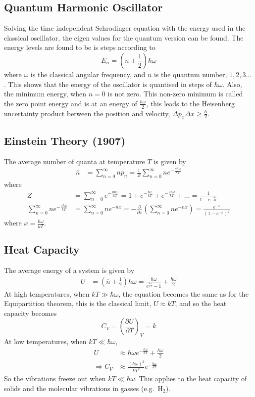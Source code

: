 \documentclass[british]{article}
\newcommand{\pd}[2]{\frac{\partial #1}{\partial #2}} %
\begin{document}
\subsection{Quantum Harmonic Oscillator}
Solving the time independent Schrodinger equation with the energy used in the classical oscillator, the eigen values for the quantum version can be found. The energy levels are found to be is steps according to
\[
	E_n = \left(n+\frac{1}{2}\right)\hbar\omega
\]
where $\omega$ is the classical angular frequency, and $n$ is the quantum number, $1,2,3\ldots$. This shows that the energy of the oscillator is quantised in steps of $\hbar\omega$. Also, the minimum energy, when $n=0$ is not zero. This non-zero minimum is called the zero point energy and is at an energy of $\frac{\hbar\omega}{2}$, this leads to the Heisenberg uncertainty product between the position and velocity, $\Delta p_x\Delta x \ge \frac{\hbar}{2}$.

\subsection{Einstein Theory (1907)}
The average number of quanta at temperature $T$ is given by
\begin{align*}
	\overline{n} &= \sum_{n=0}^\infty np_n = \frac{1}{Z}\sum_{n=0}^\infty ne^{-\frac{n\hbar\omega}{kT}}
\end{align*}
where
\begin{align*}
	Z &=\sum_{n=0}^\infty e^{-\frac{n\hbar\omega}{kT}} = 1 + e^{-\frac{\hbar\omega}{kT}} + e^{-\frac{2\hbar\omega}{kT}} + \ldots = \frac{1}{1-e^{-\frac{\hbar\omega}{kT}} }\\
	\sum_{n=0}^\infty ne^{-\frac{n\hbar\omega}{kT}} &= \sum_{n=0}^\infty ne^{-nx} = -\pd{}{x}\left(\sum_{n=0}^\infty ne^{-nx} \right) = \frac{e^{-x}}{\left(1-e^{-x}\right)^2}
\end{align*}
where $x=\frac{\hbar\omega}{kT}$.

\subsection{Heat Capacity}
The average energy of a system is given by
\begin{align*}
	U &= \left(\overline{n}+\frac{1}{2}\right)\hbar\omega = \frac{\hbar\omega}{e^{\frac{\hbar\omega}{kT}}-1}+\frac{\hbar\omega}{2}
\end{align*}
At high temperatures, when $kT\gg \hbar\omega$, the equation becomes the same as for the Equipartition theorem, this is the classical limit, $U\approx kT$, and so the heat capacity becomes
\[
C_V = \left(\pd{U}{T}\right)_V = k
\]
At low temperatures, when  $kT\ll \hbar\omega$,
\begin{align*}
	U &\approx \hbar\omega e^{-\frac{\hbar\omega}{kT}}+\frac{\hbar\omega}{2} \\
	\Rightarrow C_V &\approx \frac{(\hbar\omega)^2}{kT^2}e^{-\frac{\hbar\omega}{kT}}
\end{align*}
So the vibrations freeze out when $kT\ll \hbar\omega$. This applies to the heat capacity of solids and the molecular vibrations in gasses (e.g.\ H$_2$).
\end{document}
